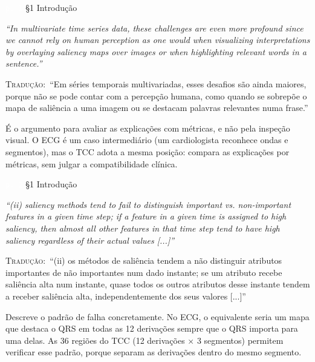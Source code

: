 \documentclass[11pt,a4paper]{article}
\newcommand{\pagechip}[1]{{\setlength{\fboxsep}{1.5pt}\colorbox{cAcc}{\textcolor{white}{\scriptsize\texttt{#1}}}}}
\newenvironment{origquote}{\par\itshape\small}{\par}
\newenvironment{tradquote}{\par\small\textsc{Tradução:}\ }{\par}
\newcommand{\explab}[1]{\par\smallskip{\small\color{cAcc}\textbf{\MakeUppercase{#1}}}\par}
\begin{document}
\begin{citacard}{\pagechip{p. 1} §1 Introdução}
\begin{origquote}“In multivariate time series data, these challenges are even more profound since we cannot rely on human perception as one would when visualizing interpretations by overlaying saliency maps over images or when highlighting relevant words in a sentence.”\end{origquote}
\begin{tradquote}“Em séries temporais multivariadas, esses desafios são ainda maiores, porque não se pode contar com a percepção humana, como quando se sobrepõe o mapa de saliência a uma imagem ou se destacam palavras relevantes numa frase.”\end{tradquote}
\explab{Explicação}
É o argumento para avaliar as explicações com métricas, e não pela inspeção visual. O ECG é um caso intermediário (um cardiologista reconhece ondas e segmentos), mas o TCC adota a mesma posição: compara as explicações por métricas, sem julgar a compatibilidade clínica.
\end{citacard}

\begin{citacard}{\pagechip{p. 2} §1 Introdução}
\begin{origquote}“(ii) saliency methods tend to fail to distinguish important vs. non-important features in a given time step; if a feature in a given time is assigned to high saliency, then almost all other features in that time step tend to have high saliency regardless of their actual values [...]”\end{origquote}
\begin{tradquote}“(ii) os métodos de saliência tendem a não distinguir atributos importantes de não importantes num dado instante; se um atributo recebe saliência alta num instante, quase todos os outros atributos desse instante tendem a receber saliência alta, independentemente dos seus valores [...]”\end{tradquote}
\explab{Explicação}
Descreve o padrão de falha concretamente. No ECG, o equivalente seria um mapa que destaca o QRS em todas as 12 derivações sempre que o QRS importa para uma delas. As 36 regiões do TCC (12 derivações $\times$ 3 segmentos) permitem verificar esse padrão, porque separam as derivações dentro do mesmo segmento.
\end{citacard}
\end{document}
